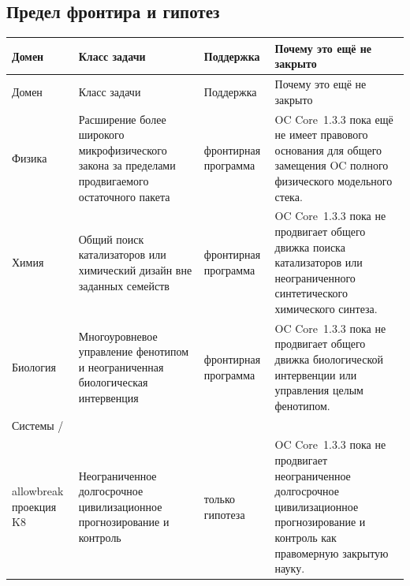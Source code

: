 \subsection{Предел фронтира и гипотез}
\begin{longtable}{@{}L{0.11\textwidth}L{0.19\textwidth}L{0.14\textwidth}L{0.48\textwidth}@{}}
\toprule
Домен & Класс задачи & Поддержка & Почему это ещё не закрыто \\
\midrule
\endfirsthead
\toprule
Домен & Класс задачи & Поддержка & Почему это ещё не закрыто \\
\midrule
\endhead
Физика & Расширение более широкого микрофизического закона за пределами продвигаемого остаточного пакета & фронтирная программа & OC Core~1.3.3 пока ещё не имеет правового основания для общего замещения OC полного физического модельного стека. \\
Химия & Общий поиск катализаторов или химический дизайн вне заданных семейств & фронтирная программа & OC Core~1.3.3 пока не продвигает общего движка поиска катализаторов или неограниченного синтетического химического синтеза. \\
Биология & Многоуровневое управление фенотипом и неограниченная биологическая интервенция & фронтирная программа & OC Core~1.3.3 пока не продвигает общего движка биологической интервенции или управления целым фенотипом. \\
Системы /\\allowbreak проекция K8 & Неограниченное долгосрочное цивилизационное прогнозирование и контроль & только гипотеза & OC Core~1.3.3 пока не продвигает неограниченное долгосрочное цивилизационное прогнозирование и контроль как правомерную закрытую науку. \\
\bottomrule
\end{longtable}
\endgroup
